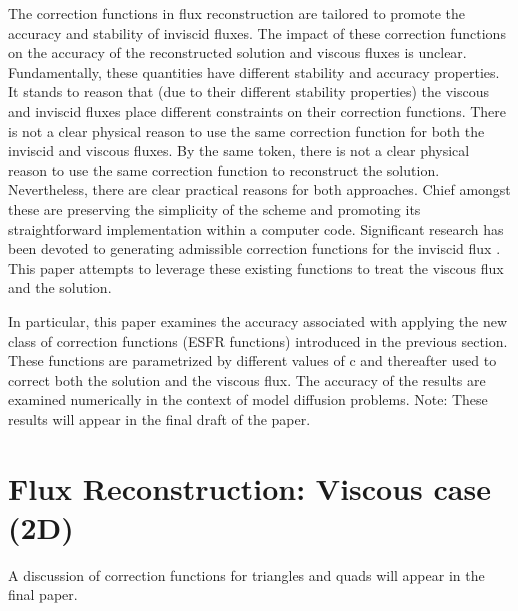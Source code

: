 The correction functions in flux reconstruction are tailored to promote the accuracy and stability of inviscid fluxes. The impact of these correction functions on the accuracy of the reconstructed solution and viscous fluxes is unclear. Fundamentally, these quantities have different stability and accuracy properties. It stands to reason that (due to their different stability properties) the viscous and inviscid fluxes place different constraints on their correction functions. There is not a clear physical reason to use the same correction function for both the inviscid and viscous fluxes. By the same token, there is not a clear physical reason to use the same correction function to reconstruct the solution. Nevertheless, there are clear practical reasons for both approaches. Chief amongst these are preserving the simplicity of the scheme and promoting its straightforward implementation within a computer code. Significant research has been devoted to generating admissible correction functions for the inviscid flux \cite{Vincent10}. This paper attempts to leverage these existing functions to treat the viscous flux and the solution. 

\vspace{0.1in}
\noindent In particular, this paper examines the accuracy associated with applying the new class of correction functions (ESFR functions) introduced in the previous section. These functions are parametrized by different values of c and thereafter used to correct both the solution and the viscous flux. The accuracy of the results are examined numerically in the context of model diffusion problems. Note: These results will appear in the final draft of the paper.


\vspace{0.2 in}
\section{Flux Reconstruction: Viscous case (2D)}

\noindent A discussion of correction functions for triangles and quads will appear in the final paper.
